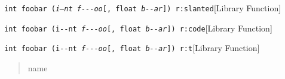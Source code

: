 \documentclass{book}
\begin{document}
%
\noindent\texttt{int foobar (\textnormal{\textsl{i--nt}} \textsl{f{-}{-}{-}oo}[, float \textsl{b{-}{-}ar}{]}) r:slanted}\hfill[Library Function]



%
\noindent\texttt{int foobar (\textnormal{\texttt{i{-}{-}nt}} \textsl{f{-}{-}{-}oo}[, float \textsl{b{-}{-}ar}{]}) r:code}\hfill[Library Function]



%
\noindent\texttt{int foobar (\textnormal{\texttt{i{-}{-}nt}} \textsl{f{-}{-}{-}oo}[, float \textsl{b{-}{-}ar}{]}) r:t}\hfill[Library Function]



%
\begin{quote}
name
\end{quote}
\end{document}
